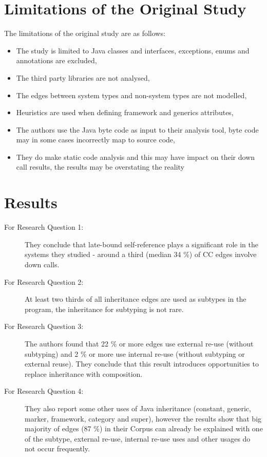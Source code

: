 \documentclass [11pt, parskip=full] {article}
\begin{document}
\section{Limitations of the Original Study}
The limitations of the original study are as follows: 
\begin{itemize}
\item The study is limited to Java classes and interfaces, exceptions, enums and annotations are excluded,
\item The third party libraries are not analysed,
\item The edges between system types and non-system types are not modelled,
\item Heuristics are used when defining framework and generics attributes,
\item The authors use the Java byte code as input to their analysis tool, byte code may in some cases incorrectly map to source code,
\item They do make static code analysis and this may have impact on their down call results, the results may be overstating the reality
\end{itemize}


\section{Results} \label{OriginalResults}

\begin{description}
\item [For Research Question 1:] They conclude that late-bound self-reference plays a significant role in the systems they studied - around a third (median 34 \%) of CC edges involve down calls.

\item [For Research Question 2:] At least two thirds of all inheritance edges are used as subtypes in the program, the inheritance for subtyping is not rare.

\item[For Research Question 3:] The authors found that 22 \% or more edges use external re-use (without subtyping) and 2 \% or more use internal re-use (without subtyping or external reuse). They conclude that this result introduces opportunities to replace inheritance with composition. 

\item[For Research Question 4:] They also report some other uses of Java inheritance (constant, generic, marker, framework, category and super), however the results show that big majority of edges (87 \%) in their Corpus can already be explained with one of the subtype, external re-use, internal re-use uses and other usages do not occur frequently.

\end{description}
\end{document}

